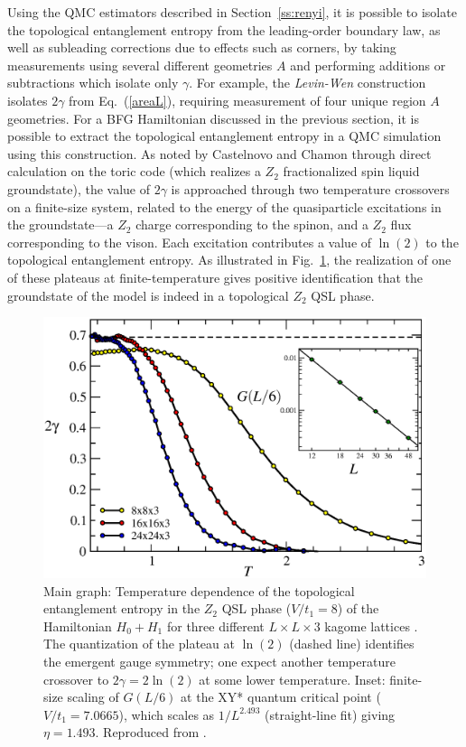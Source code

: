 \documentclass[range]{ar2e}
\begin{document}
Using the QMC estimators described in Section~\ref{ss:renyi}, it is possible to isolate the topological entanglement entropy from the leading-order boundary law, as well as subleading corrections due to effects such as corners, by taking measurements using several different geometries $A$ and performing additions or subtractions which isolate only $\gamma$.  For example, the {\it Levin-Wen} \cite{LW} construction isolates $2\gamma$ from Eq.~(\ref{areaL}), requiring measurement of four unique region $A$ geometries.  For a BFG Hamiltonian discussed in the 
previous section, it is possible to extract the topological entanglement entropy in a QMC simulation using this construction.  As noted by Castelnovo and Chamon \cite{castelnovo} through direct calculation on the toric code (which realizes a $Z_2$ fractionalized spin liquid groundstate), the value of $2\gamma$ is approached through two temperature crossovers on a finite-size system, related to the energy of the quasiparticle excitations in the groundstate---a $Z_2$ charge corresponding to the spinon, and a $Z_2$ flux corresponding to the vison.  Each excitation contributes a value of $\ln(2)$ to the topological entanglement entropy.  As illustrated in Fig.~\ref{QSLfig}, the realization of one of these plateaus at finite-temperature gives positive identification that the groundstate of the model is indeed in a topological $Z_2$ QSL phase.

\begin{figure}
\centerline{\includegraphics[width=4.5in]{QSL}}
\caption{Main graph: Temperature dependence of the topological entanglement entropy in the $Z_2$ QSL phase ($V/t_1 = 8$) of the Hamiltonian $H_0 + H_1$ 
for three different $L \times L \times 3$ kagome lattices \cite{TopoEE}.  The quantization of the plateau at $\ln(2)$ (dashed line) identifies the emergent 
gauge symmetry; one expect another temperature crossover to $2 \gamma = 2 \ln(2)$ at some lower temperature. Inset: finite-size scaling of $G(L/6)$ at the 
XY* quantum critical point ($V/t_1 = 7.0665$), which scales as  $1/L^{2.493}$ (straight-line fit) giving $\eta = 1.493$. Reproduced from \cite{XYstarQMC}.}
\label{QSLfig}
\end{figure}
\end{document}
